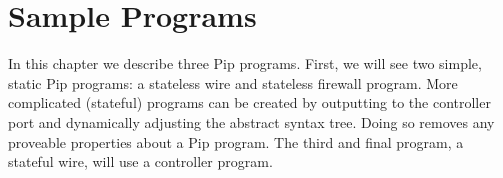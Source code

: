 
\section{Sample Programs}

In this chapter we describe three Pip programs. First, we will see two simple, static Pip programs: a stateless wire and stateless firewall program. More complicated (stateful) programs can be created by outputting to the controller port and dynamically adjusting the abstract syntax tree. Doing so removes any proveable properties about a Pip program. The third and final program, a stateful wire, will use a controller program.



